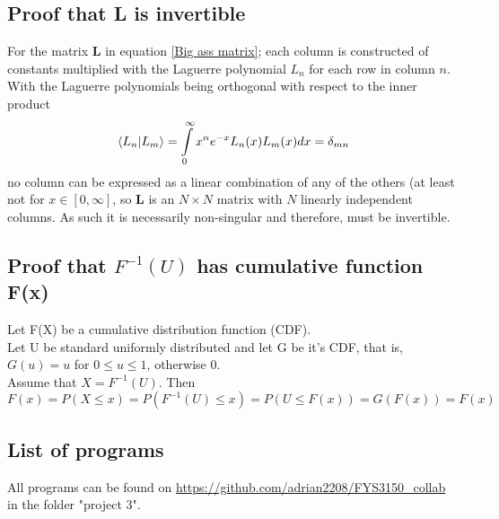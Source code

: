 \documentclass[10pt,a4paper]{article}
\begin{document}
\subsection{Proof that \textbf{L} is invertible}\label{Proof that big ass matrix is invertible}
For the matrix $\textbf{L}$ in equation \ref{Big ass matrix}; each column is constructed of constants multiplied with the Laguerre polynomial $L_n$ for each row in column $n$. With the Laguerre polynomials being orthogonal with respect to the inner product
\begin{equation}
\braket{L_n|L_m} = \int\limits_0^\infty x^\alpha e^{-x} L_n(x) L_m(x) dx = \delta_{mn}
\end{equation}
no column can be expressed as a linear combination of any of the others (at least not for $x \in [0,\infty]$, so \textbf{L} is an $N\times N$ matrix with $N$ linearly independent columns. As such it is necessarily non-singular and therefore, must be invertible.
\subsection{Proof that $F^{-1}(U)$ has cumulative function F(x)}
Let F(X) be a cumulative distribution function (CDF).\\
Let U be standard uniformly distributed and let G be it's CDF, that is, $G(u)=u$ for $0\leq u\leq 1$, otherwise 0.\\
Assume that $X=F^{-1}(U)$. Then
$$F(x)=P(X\leq x)=P(F^{-1}(U)\leq x)=P(U\leq F(x))=G(F(x))=F(x) 
$$ 
\subsection{List of programs}
All programs can be found on \url{https://github.com/adrian2208/FYS3150_collab} in the folder "project 3".
\end{document}

